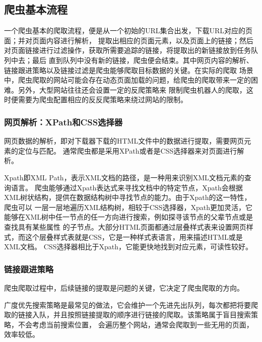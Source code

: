 \documentclass[master]{njuthesis}
\begin{document}
\subsection{爬虫基本流程}
一个爬虫基本的爬取流程\cite{wikipedia_web_crawler}，便是从一个初始的URL集合出发，下载URL对应的页面；并对页面内容进行解析，
提取出相应的页面元素，以及页面上的链接；然后对页面链接进行过滤操作，获取所需要追踪的链接，将提取出的新链接放到任务队列中去；最后
直到队列中没有新的链接，爬虫便会结束。其中网页内容的解析、链接跟进策略以及链接过滤是爬虫能够爬取目标数据的关键。在实际的爬取
场景中，爬虫爬取的网站可能会存在动态页面加载的问题，给爬虫的爬取带来一定的困难。另外，大型网站往往还会设置一定的反爬策略来
限制爬虫机器人的爬取，这时便需要为爬虫配置相应的反反爬策略来绕过网站的限制。



\subsubsection{网页解析：XPath和CSS选择器}\label{page_parser}
网页数据的解析，即对下载器下载的HTML文件中的数据进行提取，需要网页元素的定位与匹配。
通常爬虫都是采用XPath或者是CSS选择器来对页面进行解析\cite{panum2019kraaler}。

Xpath即XML Path，表示XML文档的路径，是一种用来识别XML文档元素的查询语言\cite{grigalis2014using}。
爬虫能够通过Xpath表达式来寻找文档中的特定节点，Xpath会根据XML树状结构，提供在数据结构树中寻找节点的能力。由于Xpath的这一特性，爬虫可以
一层一层地遍历XML结构树，相较于CSS选择器，Xpath更加灵活，它能够在XML树中任一节点的任一方向进行搜索，例如探寻该节点的父辈节点或是查找具有某些属性
的子节点。大部分HTML页面都通过层叠样式表来设置网页样式，而这个层叠样式表就是CSS，它是一种样式表语言，用来描述HTML或是XML文档。
CSS选择器相比于Xpath，它能更快地找到对应元素，可读性较好。

\subsubsection{链接跟进策略}
爬虫爬取过程中，后续链接的提取是问题的关键，它决定了爬虫爬取的方向\cite{mendelzon1997querying}。

广度优先搜索策略是最常见的做法，它会维护一个先进先出队列，每次都把将要爬取的链接入队，并且按照链接提取的顺序进行链接的爬取。该策略属于盲目搜索策略，不会考虑当前搜索位置，
会遍历整个网站，通常会爬取到一些无用的页面，效率较低。
\end{document}
